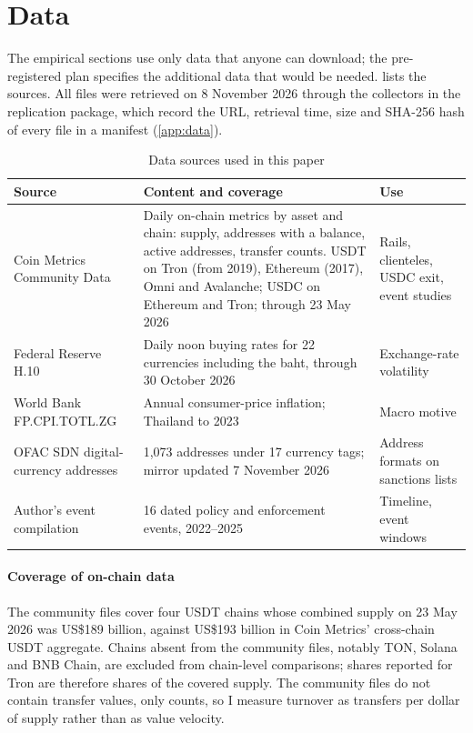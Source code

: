 \section{Data}\label{sec:data}

The empirical sections use only data that anyone can download; the pre-registered plan specifies the additional data
that would be needed.  lists the sources. All files were retrieved on 8 November 2026 through the
collectors in the replication package, which record the URL, retrieval time, size and SHA-256 hash of every file in a
manifest (\cref{app:data}).

\begin{table}[!htbp]
\centering\small
\caption{Data sources used in this paper}
\label{tab:data}
\begin{tabularx}{\textwidth}{L{3.2cm}XL{3.0cm}}
\toprule
Source & Content and coverage & Use \\
\midrule
Coin Metrics Community Data \citep{coinmetrics2026} & Daily on-chain metrics by asset and chain: supply, addresses with a balance, active
addresses, transfer counts. USDT on Tron (from 2019), Ethereum (2017), Omni and Avalanche; USDC on Ethereum and Tron;
through 23 May 2026 & Rails, clienteles, USDC exit, event studies \\
\addlinespace
Federal Reserve H.10 \citep{fred2026h10} & Daily noon buying rates for 22 currencies including the
baht, through 30 October 2026 & Exchange-rate volatility \\
\addlinespace
World Bank FP.CPI.TOTL.ZG \citep{worldbank2026cpi} & Annual consumer-price inflation; Thailand to 2023 & Macro motive \\
\addlinespace
OFAC SDN digital-currency addresses \citep{ofac2026sdn} & 1,073 addresses under 17 currency tags; mirror
updated 7 November 2026 & Address formats on sanctions lists \\
\addlinespace
Author's event compilation & 16 dated policy and enforcement events, 2022--2025 & Timeline, event windows \\
\bottomrule
\end{tabularx}
\end{table}

\paragraph{Coverage of on-chain data}
The community files cover four USDT chains whose combined supply on 23 May 2026 was US\$189 billion, against US\$193
billion in Coin Metrics' cross-chain USDT aggregate. Chains absent from the community files, notably TON, Solana and BNB
Chain, are excluded from chain-level comparisons; shares reported for Tron are therefore shares of the covered supply.
The community files do not contain transfer values, only counts, so I measure turnover as transfers per dollar of
supply rather than as value velocity.

